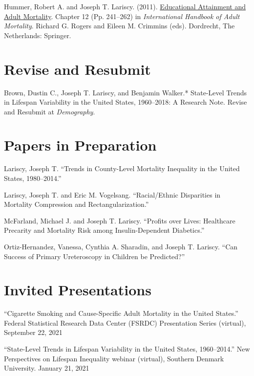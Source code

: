 \documentclass[11pt,]{article}
\begin{document}
Hummer, Robert A. and Joseph T. Lariscy. (2011).
\href{https://link.springer.com/chapter/10.1007/978-90-481-9996-9_12}{Educational
Attainment and Adult Mortality}. Chapter 12 (Pp. 241--262) in
\emph{International Handbook of Adult Mortality}. Richard G. Rogers and
Eileen M. Crimmins (eds). Dordrecht, The Netherlands: Springer.

\hypertarget{revise-and-resubmit}{%
\section{Revise and Resubmit}\label{revise-and-resubmit}}

Brown, Dustin C., Joseph T. Lariscy, and Benjamin Walker.* State-Level
Trends in Lifespan Variability in the United States, 1960--2018: A
Research Note. Revise and Resubmit at \emph{Demography}.

\hypertarget{papers-in-preparation}{%
\section{Papers in Preparation}\label{papers-in-preparation}}

Lariscy, Joseph T. ``Trends in County-Level Mortality Inequality in the
United States, 1980--2014.''

Lariscy, Joseph T. and Eric M. Vogelsang. ``Racial/Ethnic Disparities in
Mortality Compression and Rectangularization.''

McFarland, Michael J. and Joseph T. Lariscy. ``Profits over Lives:
Healthcare Precarity and Mortality Risk among Insulin-Dependent
Diabetics.''

Ortiz-Hernandez, Vanessa, Cynthia A. Sharadin, and Joseph T. Lariscy.
``Can Success of Primary Ureteroscopy in Children be Predicted?''

\hypertarget{invited-presentations}{%
\section{Invited Presentations}\label{invited-presentations}}

``Cigarette Smoking and Cause-Specific Adult Mortality in the United
States.'' Federal Statistical Research Data Center (FSRDC) Presentation
Series (virtual), September 22, 2021

``State-Level Trends in Lifespan Variability in the United States,
1960--2014.'' New Perspectives on Lifespan Inequality webinar (virtual),
Southern Denmark University. January 21, 2021
\end{document}
